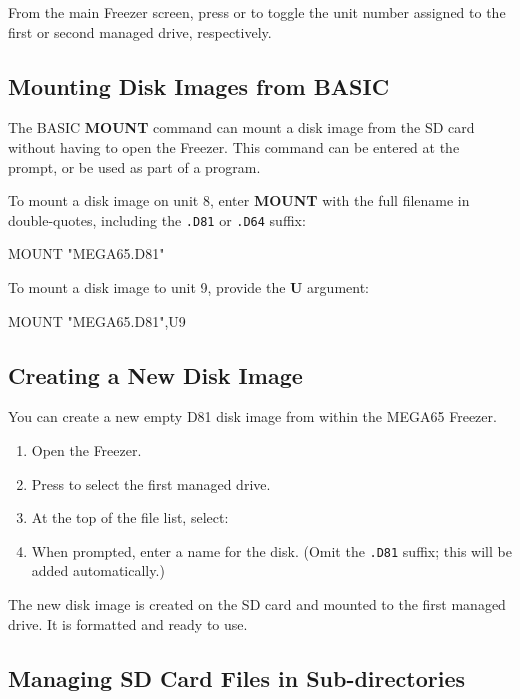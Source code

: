From the main Freezer screen, press  or  to toggle the unit number assigned to the first or second managed drive, respectively.

\subsection{Mounting Disk Images from BASIC}

The BASIC {\bf MOUNT} command can mount a disk image from the SD card without having to open the Freezer. This command can be entered at the  prompt, or be used as part of a program.

To mount a disk image on unit 8, enter {\bf MOUNT} with the full filename in double-quotes, including the {\tt .D81} or {\tt .D64} suffix:

\begin{screencode}
MOUNT "MEGA65.D81"
\end{screencode}

To mount a disk image to unit 9, provide the {\bf U} argument:

\begin{screencode}
MOUNT "MEGA65.D81",U9
\end{screencode}

\subsection{Creating a New Disk Image}

You can create a new empty D81 disk image from within the MEGA65 Freezer.

\begin{enumerate}
\item Open the Freezer.
\item Press  to select the first managed drive.
\item At the top of the file list, select: 
\item When prompted, enter a name for the disk. (Omit the {\tt .D81} suffix; this will be added automatically.)
\end{enumerate}

The new disk image is created on the SD card and mounted to the first managed drive. It is formatted and ready to use.

\subsection{Managing SD Card Files in Sub-directories}

